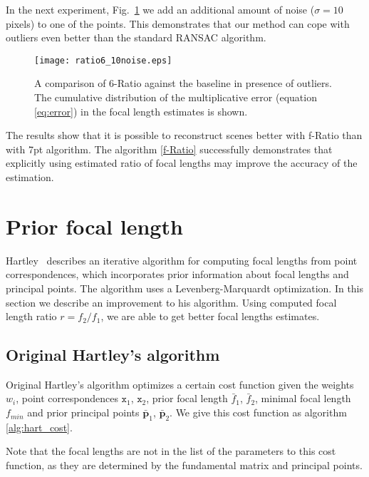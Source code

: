 In the next experiment, Fig.~\ref{fratio_10noise} we add an additional amount of noise ($\sigma=10$ pixels) to one of the points. This demonstrates that our method can cope with outliers even better than the standard RANSAC algorithm.

\begin{figure}[h!]
  \begin{center}
    \texttt{[image: ratio6\_10noise.eps]}
    \caption[Performance of f-Ratio with one outlier]{A comparison of 6-Ratio against the baseline in presence of outliers. The cumulative distribution of the  multiplicative error (equation \ref{eq:error})  in the focal  length  estimates is shown. }
    \label{fratio_10noise}
  \end{center}
\end{figure}

The results show that it is possible to reconstruct  scenes better with f-Ratio than with 7pt algorithm. The algorithm  \ref{f-Ratio} successfully demonstrates that explicitly using estimated ratio of focal lengths
may improve the accuracy of the estimation.

\section{Prior focal length}

Hartley~\cite{HartleyPriors} describes an iterative algorithm for computing focal lengths from point correspondences, which incorporates prior information about focal lengths and principal points. The algorithm uses a Levenberg-Marquardt optimization. In this section we describe an improvement to his algorithm. Using computed focal length ratio $r=f_2 \slash f_1$, we are able to get better focal lengths estimates.

\subsection{Original Hartley's algorithm}

Original Hartley's algorithm optimizes a certain cost function given the weights $w_i$, point correspondences $\mathtt{x}_1$, $\mathtt{x}_2$, prior focal length  $\bar{f}_1$, $\bar{f}_2$, minimal focal length $f_{min}$ and prior principal points $\bar{\mathbf{p}}_1$, $\bar{\mathbf{p}}_2$. We give this cost function as algorithm \ref{alg:hart_cost}. 


Note that the focal lengths are not in the list of the parameters to this cost function, as they are determined by the fundamental matrix and principal points.

